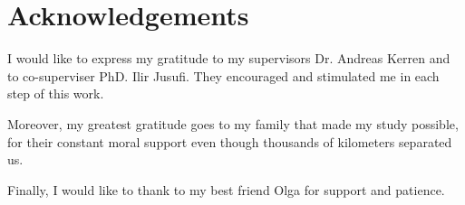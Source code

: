 \section*{Acknowledgements}
\label{sec:acknowledgements}

I would like to express my gratitude to my supervisors Dr. Andreas Kerren and to co-superviser PhD. Ilir Jusufi. They encouraged and stimulated me in each step of this work.

Moreover, my greatest gratitude goes to my family that made my study possible, for their constant moral support even though thousands of kilometers separated us.

Finally, I would like to thank to my best friend Olga for support and patience.